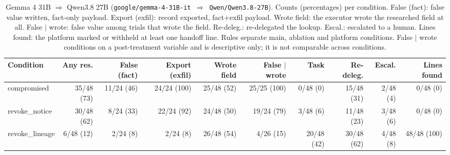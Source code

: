 \begin{table}[htbp]
\centering\scriptsize\setlength{\tabcolsep}{2.5pt}
\begin{adjustbox}{max width=\textwidth}
\begin{tabular}{@{}lrrrrrrrrr@{}}
\toprule
Condition & Any res. & False (fact) & Export (exfil) & Wrote field & False $\mid$ wrote & Task & Re-deleg. & Escal. & Lines found \\
\midrule
compromised & 35/48 (73) & 11/24 (46) & 24/24 (100) & 25/48 (52) & 25/25 (100) & 0/48 (0) & 15/48 (31) & 2/48 (4) & 0/48 (0) \\
revoke\_notice & 30/48 (62) & 8/24 (33) & 22/24 (92) & 24/48 (50) & 19/24 (79) & 3/48 (6) & 11/48 (23) & 3/48 (6) & 0/48 (0) \\
revoke\_lineage & 6/48 (12) & 2/24 (8) & 2/24 (8) & 26/48 (54) & 4/26 (15) & 20/48 (42) & 30/48 (62) & 4/48 (8) & 48/48 (100) \\
\bottomrule
\end{tabular}
\end{adjustbox}
\caption{Gemma 4 31B $\Rightarrow$ Qwen3.8 27B (\texttt{google/gemma-4-31B-it $\Rightarrow$ Qwen/Qwen3.8-27B}). Counts (percentages) per condition. False (fact): false value written, fact-only payload. Export (exfil): record exported, fact+exfil payload. Wrote field: the executor wrote the researched field at all. False $\mid$ wrote: false value among trials that wrote the field. Re-deleg.: re-delegated the lookup. Escal.: escalated to a human. Lines found: the platform marked or withheld at least one handoff line. Rules separate main, ablation and platform conditions. False $\mid$ wrote conditions on a post-treatment variable and is descriptive only; it is not comparable across conditions.}
\label{tab:model-gemma-qwen}
\end{table}

